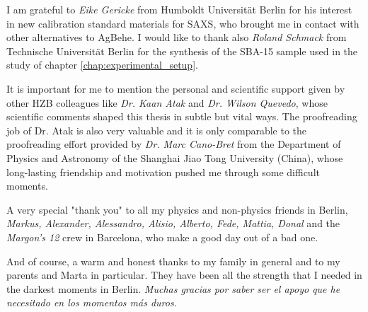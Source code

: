 \noindent I am grateful to \emph{Eike Gericke} from Humboldt Universität Berlin for his interest in new calibration standard materials for SAXS, who brought me in contact with other alternatives to AgBehe. I would like to thank also \emph{Roland Schmack} from Technische Universität Berlin for the synthesis of the SBA-15 sample used in the study of chapter \ref{chap:experimental_setup}.
\vspace{2ex}

\noindent It is important for me to mention the personal and scientific support given by other HZB colleagues like \emph{Dr. Kaan Atak} and \emph{Dr. Wilson Quevedo}, whose scientific comments shaped this thesis in subtle but vital ways. The proofreading job of Dr. Atak is also very valuable and it is only comparable to the proofreading effort provided by \emph{Dr. Marc Cano-Bret} from the Department of Physics and Astronomy of the Shanghai Jiao Tong University (China), whose long-lasting friendship and motivation pushed me through some difficult moments.
\vspace{2ex}

\noindent A very special "thank you" to all my physics and non-physics friends in Berlin, \emph{Markus, Alexander, Alessandro, Alisio, Alberto, Fede, Mattia, Donal} and the \emph{Margon's 12} crew in Barcelona, who make a good day out of a bad one.
\vspace{2ex}

\noindent And of course, a warm and honest thanks to my family in general and to my parents and Marta in particular. They have been all the strength that I needed in the darkest moments in Berlin. \emph{Muchas gracias por saber ser el apoyo que he necesitado en los momentos m\'{a}s duros}.

\cleardoublepage
